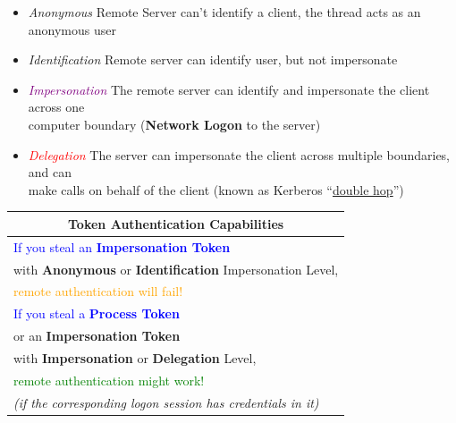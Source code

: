 \begin{itemize}
   \item \textit{Anonymous} \hspace{1.5cm} Remote Server can't identify a client, the thread acts as an anonymous user
   
   \item \textit{Identification} \hspace{1.1cm} Remote server can identify user, but not impersonate
   
   \item \textit{\textcolor{purple}{Impersonation}} \hspace{0.8cm} The remote server can identify and impersonate the client across one\\
   \hspace*{4cm} computer boundary (\textbf{Network Logon} to the server)
   
   \item \textit{\textcolor{red}{Delegation}} \hspace{1.3cm} The server can impersonate the client across multiple boundaries, and can\\
   \hspace*{4cm} make calls on behalf of the client (known as Kerberos ``\underline{double hop}'')
\end{itemize}

\begin{tabular}{|l|l|}
    \hline
    \multicolumn{2}{|c|}{\textbf{Token Authentication Capabilities}} \\
    \hline
    \multicolumn{2}{|l|}{\textcolor{blue}{If you steal an \textbf{Impersonation Token}}} \\
    \multicolumn{2}{|l|}{with \textbf{Anonymous} or \textbf{Identification} Impersonation Level,} \\
    \multicolumn{2}{|l|}{\textcolor{orange}{remote authentication will fail!}} \\
    \hline
    \multicolumn{2}{|l|}{\textcolor{blue}{If you steal a \textbf{Process Token}}} \\
    \multicolumn{2}{|l|}{or an \textbf{Impersonation Token}} \\
    \multicolumn{2}{|l|}{with \textbf{Impersonation} or \textbf{Delegation} Level,} \\
    \multicolumn{2}{|l|}{\textcolor{green}{remote authentication might work!}} \\
    \multicolumn{2}{|l|}{\textit{(if the corresponding logon session has credentials in it)}} \\
    \hline
\end{tabular}

